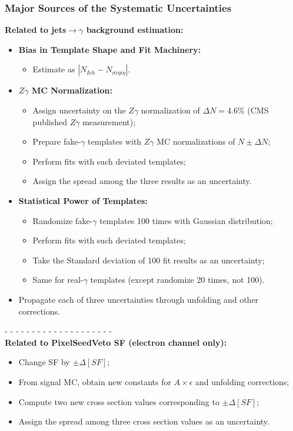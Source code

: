 \begin{frame}\frametitle{Major Sources of the Systematic Uncertainties}

\footnotesize{\bfseries{Related to jets$\rightarrow\gamma$ background estimation:}}
  \begin{itemize}
     \scriptsize
     \item {\bfseries{Bias in Template Shape and Fit Machinery:}} 
        \begin{itemize}
          \tiny
          \item Estimate as $|N_{Ich}-N_{\sigma{i\eta i\eta}}|$.
         \end{itemize}
     \item {\bfseries{$Z\gamma$ MC Normalization:}}
        \begin{itemize}
          \tiny
          \item Assign uncertainty on the $Z\gamma$ normalization of $\Delta N=$4.6\% (CMS published $Z\gamma$ measurement);
          \item Prepare fake-$\gamma$ templates with $Z\gamma$ MC normalizations of $N\pm\Delta N$;
          \item Perform fits with such deviated templates;
          \item Assign the spread among the three results as an uncertainty.
        \end{itemize}
     \item {\bfseries{Statistical Power of Templates:}}
       \begin{itemize}
          \tiny
          \item Randomize fake-$\gamma$ templates 100 times with Gaussian distribution;
          \item Perform fits with such deviated templates;
          \item Take the Standard deviation of 100 fit results as an uncertainty;
          \item Same for real-$\gamma$ templates (except randomize 20 times, not 100).
       \end{itemize}
     \item Propagate each of three uncertainties through unfolding and other corrections.
  \end{itemize}

\footnotesize{- - - - - - - - - - - - - - - - - - - -}\\
\footnotesize{\bfseries{Related to PixelSeedVeto SF (electron channel only):}}
  \begin{itemize}
  \begin{itemize}
     \tiny
     \item Change SF by $\pm \Delta[SF]$;
     \item From signal MC, obtain new constants for $A \times \epsilon$ and unfolding corrections;
     \item Compute two new cross section values corresponding to $\pm \Delta[SF]$;
     \item Assign the spread among three cross section values as an uncertainty. 
  \end{itemize}
  \end{itemize}
\end{frame}%

